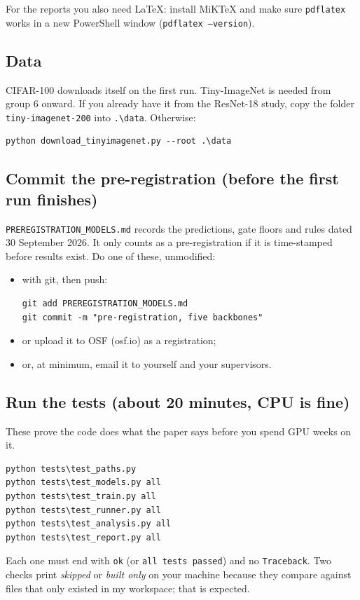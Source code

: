 \documentclass[10.5pt,a4paper]{article}
\newcommand{\cmd}[1]{\texttt{#1}}
\begin{document}
For the reports you also need LaTeX: install MiKTeX and make sure \cmd{pdflatex} works in a new PowerShell window (\cmd{pdflatex --version}).

\subsection{Data}
CIFAR-100 downloads itself on the first run. Tiny-ImageNet is needed from group 6 onward. If you already have it from the ResNet-18 study, copy the folder \cmd{tiny-imagenet-200} into \cmd{.\textbackslash data}. Otherwise:
\begin{lstlisting}
python download_tinyimagenet.py --root .\data
\end{lstlisting}

\subsection{Commit the pre-registration (before the first run finishes)}
\cmd{PREREGISTRATION\_MODELS.md} records the predictions, gate floors and rules dated 30 September 2026. It only counts as a pre-registration if it is time-stamped before results exist. Do one of these, unmodified:
\begin{itemize}
\item with git, then push:
\begin{lstlisting}
git add PREREGISTRATION_MODELS.md
git commit -m "pre-registration, five backbones"
\end{lstlisting}
\item or upload it to OSF (osf.io) as a registration;
\item or, at minimum, email it to yourself and your supervisors.
\end{itemize}

\subsection{Run the tests (about 20 minutes, CPU is fine)}
These prove the code does what the paper says before you spend GPU weeks on it.
\begin{lstlisting}
python tests\test_paths.py
python tests\test_models.py all
python tests\test_train.py all
python tests\test_runner.py all
python tests\test_analysis.py all
python tests\test_report.py all
\end{lstlisting}
Each one must end with \cmd{ok} (or \cmd{all tests passed}) and no \cmd{Traceback}. Two checks print \emph{skipped} or \emph{built only} on your machine because they compare against files that only existed in my workspace; that is expected.
\end{document}
